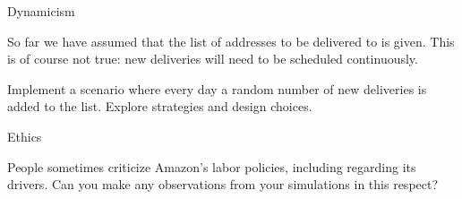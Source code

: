  {Dynamicism}

So far we have assumed that the list of addresses to be delivered to
is given. This is of course not true: new deliveries will need to be
scheduled continuously.

\begin{exercise}
  Implement a scenario where every day a random number of new
  deliveries is added to the list. Explore strategies and design choices.
\end{exercise}

 {Ethics}

People sometimes criticize Amazon's labor policies,
including regarding its drivers.
Can you make any observations from your simulations in this respect?
